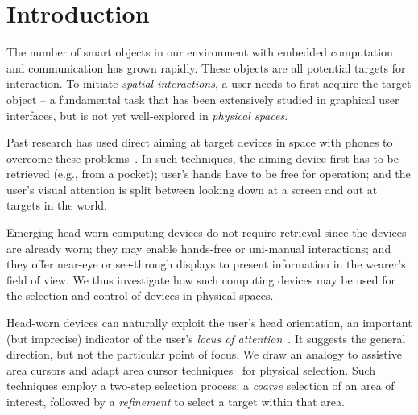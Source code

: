 \vfill
\section{Introduction}

The number of smart objects in our environment with embedded computation and communication has grown rapidly. These objects are all potential targets for interaction. To initiate {\em spatial interactions}, a user needs to first acquire the target object -- a fundamental task that has been extensively studied in graphical user interfaces, but is not yet well-explored in {\em physical spaces}.

%
%
Past research has used direct aiming at target devices in space with phones to overcome these problems~\cite{beigl_point_1999,patel_2-way_2003}. In such techniques, the aiming device first has to be retrieved (e.g., from a pocket); user's hands have to be free for operation; and the user's visual attention is split between looking down at a screen and out at targets in the world. 

Emerging head-worn computing devices do not require retrieval since the devices are already worn; they may enable hands-free or uni-manual interactions; and they offer near-eye or see-through displays to present information in the wearer's field of view. We thus investigate how such computing devices may be used for the selection and control of devices in physical spaces.

Head-worn devices can naturally exploit the user's head orientation, an important (but imprecise) indicator of the user's {\em locus of attention}~\cite{raskin}. It suggests the general direction, but not the particular point of focus. We draw an analogy to assistive area cursors and adapt area cursor techniques~\cite{kabbash1995prince,worden1997making,findlater2010enhanced} for physical selection. Such techniques employ a two-step selection process: a {\em coarse} selection of an area of interest, followed by a {\em refinement} to select a target within that area.

